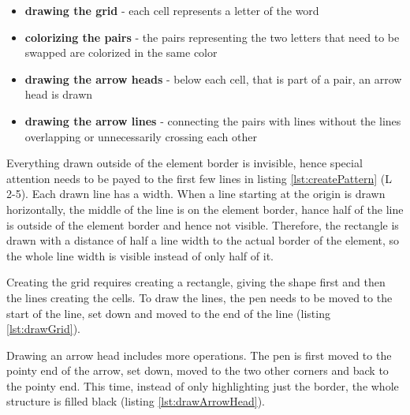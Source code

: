 \begin{itemize}
  \item \textbf{drawing the grid} - each cell represents a letter of the word
  \item \textbf{colorizing the pairs} - the pairs representing the two letters that need to be swapped are colorized in the same color
  \item \textbf{drawing the arrow heads} - below each cell, that is part of a pair, an arrow head is drawn
  \item \textbf{drawing the arrow lines} - connecting the pairs with lines without the lines overlapping or unnecessarily crossing each other
\end{itemize}

Everything drawn outside of the  element border is invisible, hence special attention needs to be payed to the first few lines in listing \ref{lst:createPattern} (L 2-5). Each drawn line has a width. When a line starting at the origin is drawn horizontally, the middle of the line is on the  element border, hance half of the line is outside of the  element border and hence not visible. Therefore, the rectangle is drawn with a distance of half a line width to the actual border of the  element, so the whole line width is visible instead of only half of it. 

Creating the grid requires creating a rectangle, giving the shape first and then the lines creating the cells. To draw the lines, the pen needs to be moved to the start of the line, set down and moved to the end of the line (listing \ref{lst:drawGrid}). 

Drawing an arrow head includes more operations. The pen is first moved to the pointy end of the arrow, set down, moved to the two other corners and back to the pointy end. This time, instead of only highlighting just the border, the whole structure is filled black (listing \ref{lst:drawArrowHead}).

